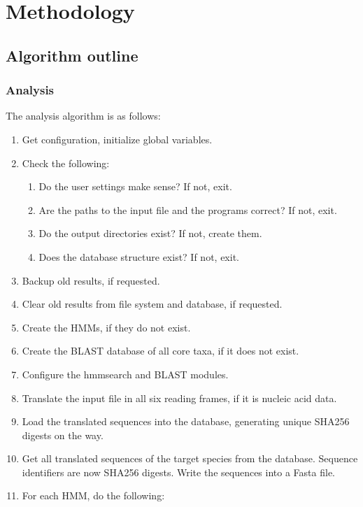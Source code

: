 \section{Methodology}

\subsection{Algorithm outline}

\subsubsection{Analysis}

The analysis algorithm is as follows:

\begin{enumerate}
	\item Get configuration, initialize global variables.
	\item Check the following:
	\begin{enumerate}
		\item Do the user settings make sense? If not, exit.
		\item Are the paths to the input file and the programs correct? If not, exit.
		\item Do the output directories exist? If not, create them.
		\item Does the database structure exist? If not, exit.
	\end{enumerate}
	\item Backup old results, if requested.
	\item Clear old results from file system and database, if requested.
	\item Create the HMMs, if they do not exist.
	\item Create the BLAST database of all core taxa, if it does not exist.
	\item Configure the hmmsearch and BLAST modules.
	\item Translate the input file in all six reading frames, if it is nucleic acid data.
	\item Load the translated sequences into the database, generating unique SHA256
		digests on the way.
	\item Get all translated sequences of the target species from the database.
		Sequence identifiers are now SHA256 digests. Write the sequences into a
		Fasta file.
	\item For each HMM, do the following:
	\begin{enumerate}

\end{enumerate}
\end{enumerate}

